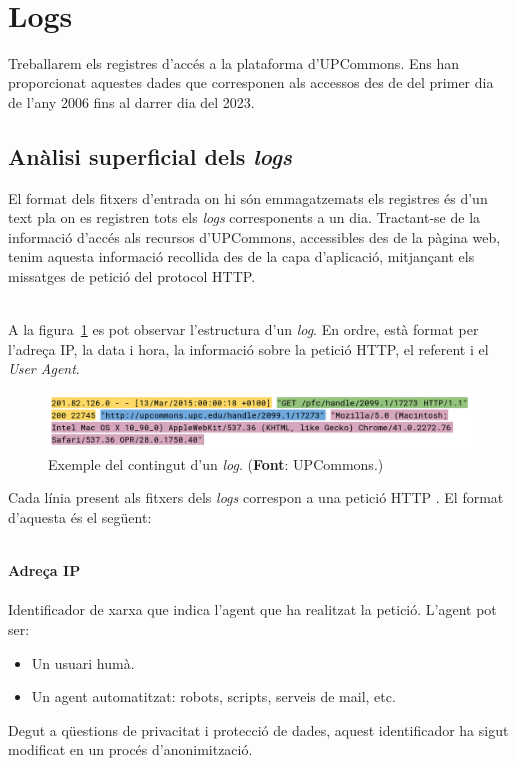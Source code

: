 \noindent \\
\section{Logs}\label{sec:logs-processing}

Treballarem els registres d'accés a la plataforma d'\gls{UPCommons}.
Ens han proporcionat aquestes dades que corresponen als accessos des de del primer dia de l'any 2006 fins al darrer dia del 2023.

\clearpage

\subsection{Anàlisi superficial dels \textit{\gls{log}s}}\label{subsec:log-analysis}

El format dels fitxers d'entrada on hi són emmagatzemats els registres és d'un text pla on es registren tots els \textit{\gls{log}s} corresponents a un dia.
Tractant-se de la informació d'accés als recursos d'\gls{UPCommons}, accessibles des de la pàgina web,
tenim aquesta informació recollida des de la capa d'aplicació, mitjançant els missatges de petició del protocol \gls{HTTP}.

\noindent \\
A la figura~\ref{fig:example-log} es pot observar l'estructura d'un \textit{\gls{log}}.
En ordre, està format per l'adreça \gls{IP}, la data i hora, la informació sobre la petició \gls{HTTP}, el referent i el \textit{User Agent}.

\begin{figure}[htbp]
    \centerline{\includegraphics[width=1\textwidth]{figures/example-log}}
    \captionsetup{justification=centering}
    \caption[Exemple del contingut d'un \textit{\gls{log}}.]{Exemple del contingut d'un \textit{\gls{log}}. (\textbf{Font}: \gls{UPCommons}.)}\label{fig:example-log}
\end{figure}

\noindent
Cada línia present als fitxers dels \textit{\gls{log}s} correspon a una petició \gls{HTTP} .
El format d'aquesta és el següent:

\noindent \\
\textbf{Adreça \gls{IP}} \\ \\
Identificador de xarxa que indica l'agent que ha realitzat la petició.
L'agent pot ser:
\begin{itemize}
    \item Un usuari humà.
    \item Un agent automatitzat: robots, scripts, serveis de mail, etc.
\end{itemize}
Degut a qüestions de privacitat i protecció de dades, aquest identificador ha sigut modificat en un procés d'anonimització. \\

